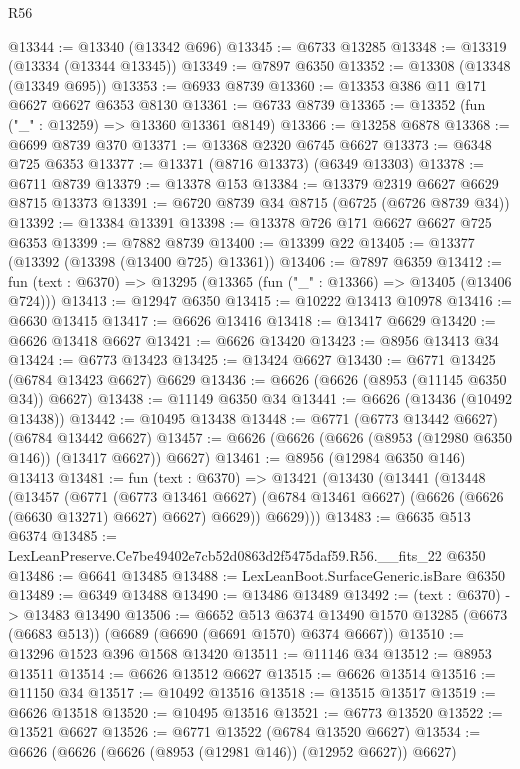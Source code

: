 \begin{lexlean}{R56}
\begin{coremodule}
@13344 := @13340 (@13342 @696)
@13345 := @6733 @13285
@13348 := @13319 (@13334 (@13344 @13345))
@13349 := @7897 @6350
@13352 := @13308 (@13348 (@13349 @695))
@13353 := @6933 @8739
@13360 := @13353 @386 @11 @171 @6627 @6627 @6353 @8130
@13361 := @6733 @8739
@13365 := @13352 (fun ("_" : @13259) => @13360 @13361 @8149)
@13366 := @13258 @6878
@13368 := @6699 @8739 @370
@13371 := @13368 @2320 @6745 @6627
@13373 := @6348 @725 @6353
@13377 := @13371 (@8716 @13373) (@6349 @13303)
@13378 := @6711 @8739
@13379 := @13378 @153
@13384 := @13379 @2319 @6627 @6629 @8715 @13373
@13391 := @6720 @8739 @34 @8715 (@6725 (@6726 @8739 @34))
@13392 := @13384 @13391
@13398 := @13378 @726 @171 @6627 @6627 @725 @6353
@13399 := @7882 @8739
@13400 := @13399 @22
@13405 := @13377 (@13392 (@13398 (@13400 @725) @13361))
@13406 := @7897 @6359
@13412 := fun (text : @6370) => @13295 (@13365 (fun ("_" : @13366) => @13405 (@13406 @724)))
@13413 := @12947 @6350
@13415 := @10222 @13413 @10978
@13416 := @6630 @13415
@13417 := @6626 @13416
@13418 := @13417 @6629
@13420 := @6626 @13418 @6627
@13421 := @6626 @13420
@13423 := @8956 @13413 @34
@13424 := @6773 @13423
@13425 := @13424 @6627
@13430 := @6771 @13425 (@6784 @13423 @6627) @6629
@13436 := @6626 (@6626 (@8953 (@11145 @6350 @34)) @6627)
@13438 := @11149 @6350 @34
@13441 := @6626 (@13436 (@10492 @13438))
@13442 := @10495 @13438
@13448 := @6771 (@6773 @13442 @6627) (@6784 @13442 @6627)
@13457 := @6626 (@6626 (@6626 (@8953 (@12980 @6350 @146)) (@13417 @6627)) @6627)
@13461 := @8956 (@12984 @6350 @146) @13413
@13481 := fun (text : @6370) =>
  @13421
    (@13430
      (@13441
        (@13448
          (@13457
            (@6771
              (@6773 @13461 @6627)
              (@6784 @13461 @6627)
              (@6626 (@6626 (@6630 @13271) @6627) @6627)
              @6629))
          @6629)))
@13483 := @6635 @513 @6374
@13485 := LexLeanPreserve.Ce7be49402e7cb52d0863d2f5475daf59.R56.__fits_22 @6350
@13486 := @6641 @13485
@13488 := LexLeanBoot.SurfaceGeneric.isBare @6350
@13489 := @6349 @13488
@13490 := @13486 @13489
@13492 := (text : @6370) -> @13483 @13490
@13506 := @6652
    @513
    @6374
    @13490
    @1570
    @13285
    (@6673 (@6683 @513))
    (@6689 (@6690 (@6691 @1570) @6374 @6667))
@13510 := @13296 @1523 @396 @1568 @13420
@13511 := @11146 @34
@13512 := @8953 @13511
@13514 := @6626 @13512 @6627
@13515 := @6626 @13514
@13516 := @11150 @34
@13517 := @10492 @13516
@13518 := @13515 @13517
@13519 := @6626 @13518
@13520 := @10495 @13516
@13521 := @6773 @13520
@13522 := @13521 @6627
@13526 := @6771 @13522 (@6784 @13520 @6627)
@13534 := @6626 (@6626 (@6626 (@8953 (@12981 @146)) (@12952 @6627)) @6627)

\end{coremodule}
\end{lexlean}
